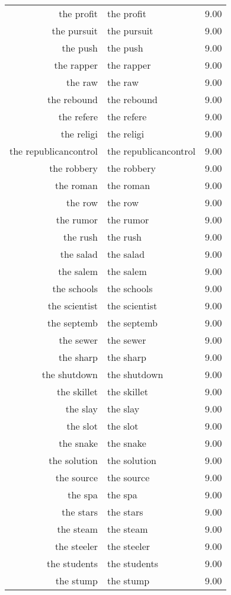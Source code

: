 \begin{table}[ht]
\begin{tabular}{rlr}
  the profit & the profit & 9.00 \\ 
  the pursuit & the pursuit & 9.00 \\ 
  the push & the push & 9.00 \\ 
  the rapper & the rapper & 9.00 \\ 
  the raw & the raw & 9.00 \\ 
  the rebound & the rebound & 9.00 \\ 
  the refere & the refere & 9.00 \\ 
  the religi & the religi & 9.00 \\ 
  the republicancontrol & the republicancontrol & 9.00 \\ 
  the robbery & the robbery & 9.00 \\ 
  the roman & the roman & 9.00 \\ 
  the row & the row & 9.00 \\ 
  the rumor & the rumor & 9.00 \\ 
  the rush & the rush & 9.00 \\ 
  the salad & the salad & 9.00 \\ 
  the salem & the salem & 9.00 \\ 
  the schools & the schools & 9.00 \\ 
  the scientist & the scientist & 9.00 \\ 
  the septemb & the septemb & 9.00 \\ 
  the sewer & the sewer & 9.00 \\ 
  the sharp & the sharp & 9.00 \\ 
  the shutdown & the shutdown & 9.00 \\ 
  the skillet & the skillet & 9.00 \\ 
  the slay & the slay & 9.00 \\ 
  the slot & the slot & 9.00 \\ 
  the snake & the snake & 9.00 \\ 
  the solution & the solution & 9.00 \\ 
  the source & the source & 9.00 \\ 
  the spa & the spa & 9.00 \\ 
  the stars & the stars & 9.00 \\ 
  the steam & the steam & 9.00 \\ 
  the steeler & the steeler & 9.00 \\ 
  the students & the students & 9.00 \\ 
  the stump & the stump & 9.00 \\ 

\end{tabular}
\end{table}
